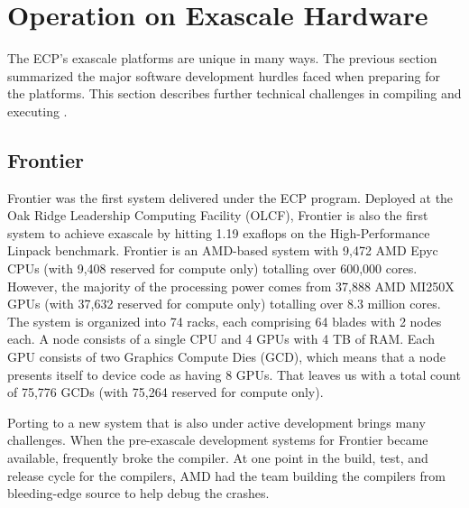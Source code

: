 \section{Operation on Exascale Hardware}

The ECP's exascale platforms are unique in many ways.
The previous section summarized the major software development hurdles faced when preparing for the platforms.
This section describes further technical challenges in compiling and executing \vtkm.


\subsection{Frontier}
Frontier was the first system delivered under the ECP program. Deployed at the Oak Ridge Leadership Computing Facility (OLCF), Frontier is also the first system to achieve exascale by hitting 1.19 exaflops on the High-Performance Linpack benchmark.
Frontier is an AMD-based system with 9,472 AMD Epyc CPUs (with 9,408 reserved for compute only) totalling over 600,000 cores.
However, the majority of the processing power comes from 37,888 AMD MI250X GPUs (with 37,632 reserved for compute only) totalling over 8.3 million cores.
The system is organized into 74 racks, each comprising 64 blades with 2 nodes each.
A node consists of a single CPU and 4 GPUs with 4 TB of RAM.
Each GPU consists of two Graphics Compute Dies (GCD), which means that a node presents itself to device code as having 8 GPUs.
That leaves us with a total count of 75,776 GCDs (with 75,264 reserved for compute only).

Porting to a new system that is also under active development brings many challenges.
When the pre-exascale development systems for Frontier became available, \vtkm frequently broke the compiler.
At one point in the build, test, and release cycle for the compilers, AMD had the \vtkm team building the compilers from bleeding-edge source to help debug the crashes.

